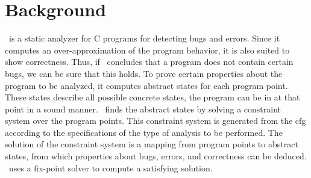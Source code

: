 \section{Background}
\label{sec:background}
\gob\ is a static analyzer for C programs for detecting bugs and errors. Since it computes an over-approximation of the program behavior, it is also suited to show correctness. Thus, if \gob\ concludes that a program does not contain certain bugs, we can be sure that this holds. To prove certain properties about the program to be analyzed, it computes abstract states for each program point. These states describe all possible concrete states, the program can be in at that point in a sound manner. \gob\ finds the abstract states by solving a constraint system over the program points. This constraint system is generated from the \ac{cfg} according to the specifications of the type of analysis to be performed. The solution of the constraint system is a mapping from program points to abstract states, from which properties about bugs, errors, and correctness can be deduced. \gob\ uses a fix-point solver to compute a satisfying solution.

